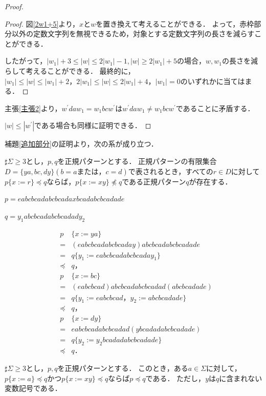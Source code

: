 \begin{proof}
\begin{proof}
図\ref{2w1+5}より，$x$と$w$を置き換えて考えることができる．
よって，赤枠部分以外の定数文字列を無視できるため，対象とする定数文字列の長さを減らすことができる．

したがって，$|w_{1}|+3 \le |w| \le 2|w_{1}|-1, |w| \ge 2|w_{1}|+5$の場合，$w,w_{1}$の長さを減らして考えることができる．
最終的に，$|w_{1}| \le |w| \le |w_{1}|+2，2|w_{1}| \le |w| \le 2|w_{1}|+4，|w_{1}|=0$のいずれかに当てはまる．
\end{proof}
主張\ref{主張2}より，$w^{\prime}daw_{1}=w_{1}bcw^{\prime}$は$w^{\prime}daw_{1}\not =w_{1}bcw^{\prime}$であることに矛盾する．

$|w| \le |w^{\prime}|$である場合も同様に証明できる．
\end{proof}
補題\ref{追加部分}の証明より，次の系が成り立つ．

\begin{col}
$\sharp \Sigma \ge 3$とし，$p, q$を正規パターンとする．
正規パターンの有限集合$D= \{ ya, bc, dy \} (b = a または，c = d)$で表されるとき，すべての$r \in D$に対して$p \{ x := r \} \preceq q$ならば，$p \{ x := xy \} \not \preceq q$である正規パターン$q$が存在する．
\end{col}

\begin{ex}
$p=eabcbcadabcbcadaxbcadabcbcadade$

$q=y_{1}abcbcadabcbcadady_{2}$

\begin{eqnarray*}
&p& \{ x:=ya \} \\ 
& = & (eabcbcadabcbcaday)abcbcadabcbcadade\\
& = & q \{ y_{1} := eabcbcadabcbcaday_{1} \} \\
& \preceq & q，\\
&p& \{ x:=bc \}  \\
& = & (eabcbcad)abcbcadabcbcadad(abcbcadade) \\
& = & q \{ y_{1} := eabcbcad，y_{2} := abcbcadade \} \\
& \preceq & q，\\
&p& \{ x:=dy \}  \\
& = & eabcbcadabcbcadad(ybcadadabcbcadade) \\
& = & q \{ y_{2} := y_{2}bcadadabcbcadade \} \\
& \preceq & q．
\end{eqnarray*}

\end{ex}

\begin{lem}\label{補題15}
$\sharp \Sigma \ge 3$とし，$p,q$を正規パターンとする．
このとき，ある$a \in \Sigma$に対して，
$p \{ x := a \} \preceq q$かつ$p \{ x := xy \} \preceq q$ならば$p \preceq q$である．
ただし，$y$は$q$に含まれない変数記号である．
\end{lem}

